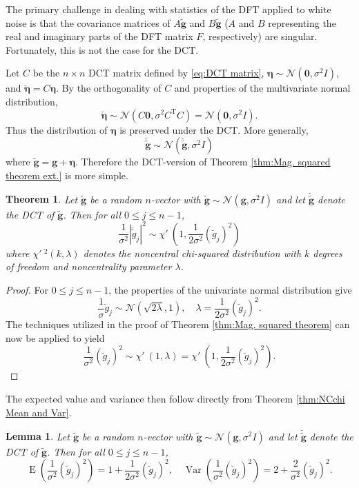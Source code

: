 \documentclass[12pt,notitlepage]{report}
\newcommand{\gVec}{\mathbf{g}}	%
\newcommand{\gnoise}{\widetilde{g}}	%
\newcommand{\gnoiseVec}{\widetilde{\mathbf{g}}}	%
\newcommand{\trans}{\mathrm{T}}	%
\newcommand{\dct}[1]{\breve{#1}}	%
\newcommand{\noise}{\eta}	%
\newcommand{\noiseSD}{\sigma}	%
\newcommand{\noiseVec}{\bm{\noise}}	%
\DeclareMathOperator{\Var}{Var}	%
\DeclareMathOperator{\E}{E}	%
\newcommand{\NCchi}{\chi'\:}	%
\newtheorem{lemma}{Lemma}[section]
\newtheorem{theorem}{Theorem}[section]
\begin{document}
The primary challenge in dealing with statistics of the DFT applied to white noise is that the covariance matrices of $A\gnoiseVec$ and $B\gnoiseVec$ ($A$ and $B$ representing the real and imaginary parts of the DFT matrix $F$, respectively) are singular. Fortunately, this is not the case for the DCT. \par 
Let $C$ be the $n \times n$ DCT matrix defined by \eqref{eq:DCT matrix}, $\noiseVec \sim \mathcal{N}(\mathbf{0},\noiseSD^2 I)$, and $\dct{\noiseVec} = C\noiseVec$. By the orthogonality of $C$ and properties of the multivariate normal distribution, 
\begin{equation}
\dct{\noiseVec} \sim \mathcal{N}(C\mathbf{0},\noiseSD^2 C^\trans{C}) = \mathcal{N}\left(\mathbf{0},\noiseSD^2 I\right).
\label{eq:DCT Noise}
\end{equation}
Thus the distribution of $\noiseVec$ is preserved under the DCT. More generally,
\[\dct{\gnoiseVec} \sim \mathcal{N}\left(\dct{\gnoiseVec},\noiseSD^2 I\right)\]
where $\gnoiseVec = \gVec + \noiseVec$. Therefore the DCT-version of Theorem \ref{thm:Mag. squared theorem ext.} is more simple.
\begin{theorem}
Let $\gnoiseVec$ be a random $n$-vector with $\gnoiseVec \sim \mathcal{N}(\gVec,\noiseSD^2 I)$ and let $\dct{\gnoiseVec}$ denote the DCT of $\gnoiseVec$. Then for all $0 \leq j \leq n-1$,
\[\frac{1}{\noiseSD^2}\left|\dct{\gnoise}_j\right|^2 \sim \NCchi\left(1,\frac{1}{2\noiseSD^2}\left(\dct{g}_j\right)^2\right)\]
where $\NCchi^2(k,\lambda)$ denotes the noncentral chi-squared distribution with $k$ degrees of freedom and noncentrality parameter $\lambda$.
\label{thm:DCT Dist}
\end{theorem}
\begin{proof}
For $0 \leq j \leq n-1$, the properties of the univariate normal distribution give
\[\frac{1}{\noiseSD}\dct{g}_j \sim \mathcal{N}\left(\sqrt{2\lambda},1\right), \quad \lambda = \frac{1}{2\noiseSD^2}\left(\dct{g}_j\right)^2.\]
The techniques utilized in the proof of Theorem \ref{thm:Mag. squared theorem} can now be applied to yield
\[\frac{1}{\noiseSD^2}\left(\dct{g}_j\right)^2 \sim \NCchi\left(1,\lambda\right) = \NCchi\left(1,\frac{1}{2\noiseSD^2}\left(\dct{g}_j\right)^2\right).\]
\end{proof}

The expected value and variance then follow directly from Theorem \ref{thm:NCchi Mean and Var}.

\begin{lemma}
Let $\gnoiseVec$ be a random $n$-vector with $\gnoiseVec \sim \mathcal{N}(\gVec,\noiseSD^2 I)$ and let $\dct{\gnoiseVec}$ denote the DCT of $\gnoiseVec$. Then for all $0 \leq j \leq n-1$,
\[\E\left(\frac{1}{\noiseSD^2}\left(\dct{g}_j\right)^2\right) = 1 + \frac{1}{2\noiseSD^2}\left(\dct{g}_j\right)^2, \quad \Var\left(\frac{1}{\noiseSD^2}\left(\dct{g}_j\right)^2\right) = 2 + \frac{2}{\noiseSD^2}\left(\dct{g}_j\right)^2.\]
\label{lem:DCT Exp and Var}
\end{lemma}
\end{document}
